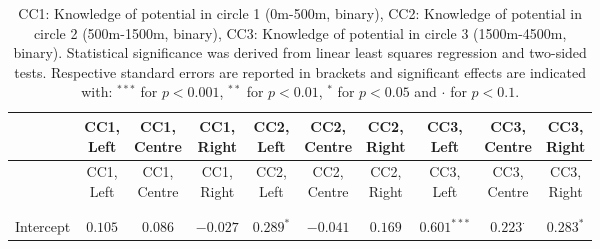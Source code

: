 
\begin{center}
\begin{small}
\begin{longtable}{l@{} c@{} c@{} c@{} c@{} c@{} c@{} c@{} c@{} c@{}}
\hline
 & \shortstack{\rule{0pt}{2.2ex}CC1,\\Left} & \shortstack{\rule{0pt}{2.2ex}CC1,\\Centre} & \shortstack{\rule{0pt}{2.2ex}CC1,\\Right} & \shortstack{\rule{0pt}{2.2ex}CC2,\\Left} & \shortstack{\rule{0pt}{2.2ex}CC2,\\Centre} & \shortstack{\rule{0pt}{2.2ex}CC2,\\Right} & \shortstack{\rule{0pt}{2.2ex}CC3,\\Left} & \shortstack{\rule{0pt}{2.2ex}CC3,\\Centre} & \shortstack{\rule{0pt}{2.2ex}CC3,\\Right} \\
\hline
\endfirsthead
\hline
 & \shortstack{\rule{0pt}{2.2ex}CC1,\\Left} & \shortstack{\rule{0pt}{2.2ex}CC1,\\Centre} & \shortstack{\rule{0pt}{2.2ex}CC1,\\Right} & \shortstack{\rule{0pt}{2.2ex}CC2,\\Left} & \shortstack{\rule{0pt}{2.2ex}CC2,\\Centre} & \shortstack{\rule{0pt}{2.2ex}CC2,\\Right} & \shortstack{\rule{0pt}{2.2ex}CC3,\\Left} & \shortstack{\rule{0pt}{2.2ex}CC3,\\Centre} & \shortstack{\rule{0pt}{2.2ex}CC3,\\Right} \\
\hline
\endhead
\hline
\endfoot
\hline
\multicolumn{10}{l}{\tiny{
}}\\
\caption{CC1: Knowledge of potential in circle 1 (0m-500m, binary), CC2: Knowledge of potential in circle 2 (500m-1500m, binary), CC3: Knowledge of potential in circle 3 (1500m-4500m, binary). Statistical significance was derived from linear least squares regression and two-sided tests. 
                Respective standard errors are reported in brackets and significant effects are indicated with: $^{***}$ for $p < 0.001$, $^{**}$ for $p < 0.01$, $^*$ for $p < 0.05$ and $\cdot$ for $p < 0.1$.}
\label{table:coefficients}
\endlastfoot \\
Intercept                           & $0.105$          & $0.086$         & $-0.027$        & $0.289^{*}$      & $-0.041$         & $0.169$          & $0.601^{***}$    & $0.223^{\cdot}$  & $0.283^{*}$      \\

\end{longtable}
\end{small}
\end{center}

